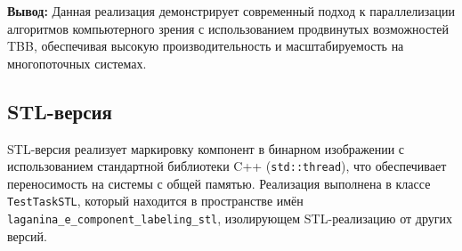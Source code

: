 \documentclass[12pt]{extarticle}
\begin{document}
\textbf{Вывод:} Данная реализация демонстрирует современный подход к параллелизации алгоритмов компьютерного зрения с использованием продвинутых возможностей TBB, обеспечивая высокую производительность и масштабируемость на многопоточных системах.
\subsection{STL-версия}

\hspace*{1.25cm}STL-версия реализует маркировку компонент в бинарном изображении с использованием стандартной библиотеки C++ (\texttt{std::thread}), что обеспечивает переносимость на системы с общей памятью. Реализация выполнена в классе \texttt{TestTaskSTL}, который находится в пространстве имён \texttt{ laganina\_e\_component\_labeling\_stl}, изолирующем STL-реализацию от других версий.
\end{document}
